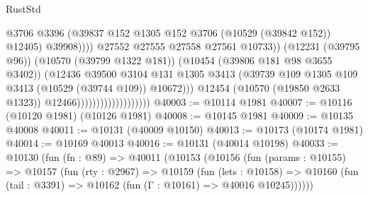 \begin{lexlean}{RustStd}
\begin{coremodule}
                                                        @3706
                                                        @3396
                                                        (@39837
                                                          @152
                                                          @1305
                                                          @152
                                                          @3706
                                                          (@10529 (@39842 @152))
                                                          @12405)
                                                        @39908))))
                                                @27552
                                                @27555
                                                @27558
                                                @27561
                                                @10733))
                                            (@12231 (@39795 @96))
                                            (@10570 (@39799 @1322 @181))
                                            (@10454 (@39806 @181 @98 @3655 @3402))
                                            (@12436
                                              @39500
                                              @3104
                                              @131
                                              @1305
                                              @3413
                                              (@39739
                                                @109
                                                @1305
                                                @109
                                                @3413
                                                (@10529 (@39744 @109))
                                                @10672)))
                                          @12454
                                          (@10570 (@19850 @2633 @1323))
                                          @12466)))))))))))))))))))
@40003 := @10114 @1981
@40007 := @10116 (@10120 @1981) (@10126 @1981)
@40008 := @10145 @1981
@40009 := @10135 @40008
@40011 := @10131 (@40009 @10150)
@40013 := @10173 (@10174 @1981)
@40014 := @10169 @40013
@40016 := @10131 (@40014 @10198)
@40033 := @10130
    (fun (fn : @89) =>
    @40011
      (@10153
        (@10156
          (fun (params : @10155) =>
          @10157
            (fun (rty : @2967) =>
            @10159
              (fun (lets : @10158) =>
              @10160 (fun (tail : @3391) => @10162 (fun (Γ : @10161) => @40016 @10245))))))

\end{coremodule}
\end{lexlean}
